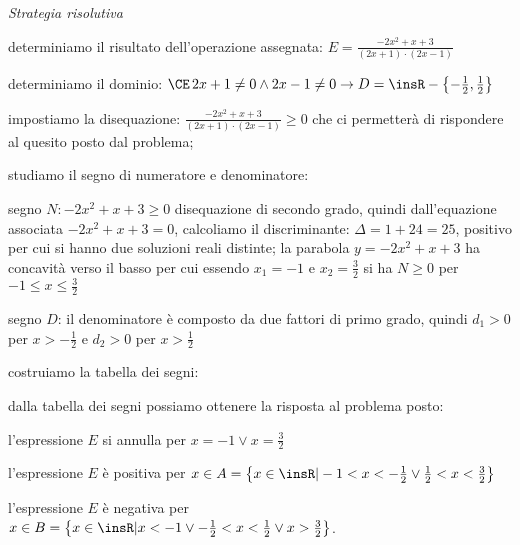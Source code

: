 \begin{esempio}
\emph{Strategia risolutiva}
\begin{enumeratea}
\item determiniamo il risultato dell'operazione assegnata: 
$E=\frac{-2x^2+x+3}{(2x+1)\cdot (2x-1)}$
\item determiniamo il dominio: $\CE\, 2x+1\neq 0\wedge 2x-1\neq 0\to 
D=\insR-\left\{-\frac 1 2,\frac 1 2\right\}$
\item impostiamo la disequazione: $\frac{-2x^2+x+3}{(2x+1)\cdot (2x-1)}\ge 0$ 
che ci permetterà di rispondere al quesito posto dal problema;
\item studiamo il segno di numeratore e denominatore:
 \begin{itemize*}
\item segno $N: -2x^2+x+3\ge 0$ disequazione di secondo grado, quindi 
dall'equazione associata $-2x^2+x+3=0$, calcoliamo il discriminante: $\Delta 
=1+24=25$, positivo per cui si hanno due soluzioni reali distinte; la parabola 
$y=-2x^2+x+3$ ha concavità verso il basso per cui essendo $x_1=-1$ e $x_2=\frac 
3 2$ si ha $N\ge 0$ per $-1\le x\le \frac 3 2$
\item segno $D$: il denominatore è composto da due fattori di primo grado, 
quindi $d_1>0$ per $x>-\frac 1 2$ e $d_2>0$ per $x>\frac 1 2$
 \end{itemize*}
\item costruiamo la tabella dei segni:
\begin{center}
 
\end{center}
\item dalla tabella dei segni possiamo ottenere la risposta al problema posto:
\begin{itemize*}
\item l'espressione $E$ si annulla per $x=-1\vee x=\frac 3 2$
\item l'espressione $E$ è positiva per $x\in A=\left\{x\in \insR | -1<x<-\frac 
1 
2\vee \frac 1 2<x<\frac 3 2\right\}$
\item l'espressione $E$ è negativa per $x\in B=\left\{x\in \insR | x<-1\vee 
-\frac 1 2<x<\frac 1 2\vee x>\frac 3 2\right\}$.
\end{itemize*}
\end{enumeratea}
\end{esempio}

